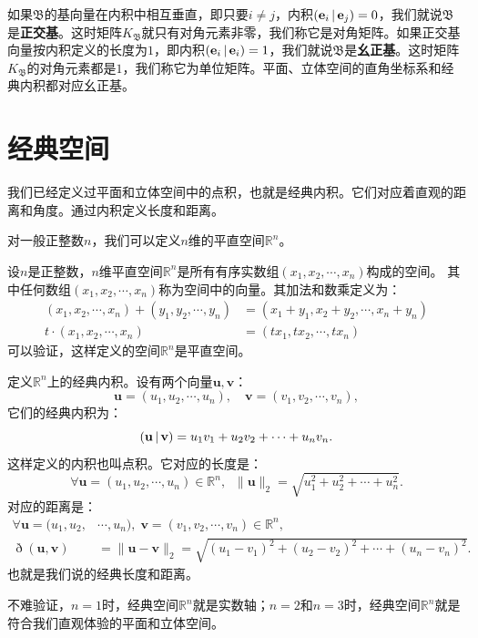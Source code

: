 \documentclass[12pt,UTF8]{ctexbook}
\begin{document}
如果$\mathfrak{B}$的基向量在内积中相互垂直，即只要$i\neq j$，内积$\displaystyle\left( \mathbf{e}_i \,|\, \mathbf{e}_j \right) = 0$，我们就说$\mathfrak{B}$是\textbf{正交基}。这时矩阵$K_{\mathfrak{B}}$就只有对角元素非零，我们称它是对角矩阵。如果正交基向量按内积定义的长度为$1$，即内积$\displaystyle\left( \mathbf{e}_i \,|\, \mathbf{e}_i \right) = 1$，我们就说$\mathfrak{B}$是\textbf{幺正基}。这时矩阵$K_{\mathfrak{B}}$的对角元素都是$1$，我们称它为单位矩阵。平面、立体空间的直角坐标系和经典内积都对应幺正基。

\section{经典空间}

我们已经定义过平面和立体空间中的点积，也就是经典内积。它们对应着直观的距离和角度。通过内积定义长度和距离。

对一般正整数$n$，我们可以定义$n$维的平直空间$\mathbb{R}^n$。
\begin{df}
    设$n$是正整数，$n$维平直空间$\mathbb{R}^n$是所有有序实数组$(x_1, x_2, \cdots, x_n)$构成的空间。
    其中任何数组$(x_1, x_2, \cdots, x_n)$称为空间中的向量。其加法和数乘定义为：
    \begin{align*}
        (x_1, x_2, \cdots, x_n) + (y_1, y_2, \cdots, y_n) &= (x_1 + y_1, x_2 + y_2, \cdots, x_n + y_n) \\
        t\cdot (x_1, x_2, \cdots, x_n) &= (tx_1, tx_2, \cdots, t x_n)
    \end{align*}
    可以验证，这样定义的空间$\mathbb{R}^n$是平直空间。

    定义$\mathbb{R}^n$上的经典内积。设有两个向量$\mathbf{u}, \mathbf{v}$：
    $$ \mathbf{u} = (u_1, u_2, \cdots, u_n), \quad  \mathbf{v} = (v_1, v_2, \cdots, v_n), $$
    它们的经典内积为：
    $$ \displaystyle\left( \mathbf{u} \,|\, \mathbf{v} \right) = u_1v_1 + u_2v_2 + \cdots + u_n v_n.$$
    这样定义的内积也叫点积。它对应的长度是：
    $$ \forall \mathbf{u} = (u_1, u_2, \cdots, u_n) \in \mathbb{R}^n, \;\; \| \mathbf{u}\|_2 = \sqrt{u_1^2 + u_2^2 + \cdots + u_n^2} .$$
    对应的距离是：
    \begin{align*}
        \forall \mathbf{u} = (u_1, u_2, &\cdots, u_n), \; \mathbf{v} = (v_1, v_2, \cdots, v_n) \in \mathbb{R}^n, \\
        \eth(\mathbf{u}, \mathbf{v}) &= \| \mathbf{u} - \mathbf{v}\|_2 = \sqrt{(u_1 - v_1)^2 + (u_2 - v_2)^2 + \cdots + (u_n - v_n)^2} .
    \end{align*}
    也就是我们说的经典长度和距离。
\end{df}
不难验证，$n=1$时，经典空间$\mathbb{R}^n$就是实数轴；$n=2$和$n=3$时，经典空间$\mathbb{R}^n$就是符合我们直观体验的平面和立体空间。
\end{document}
